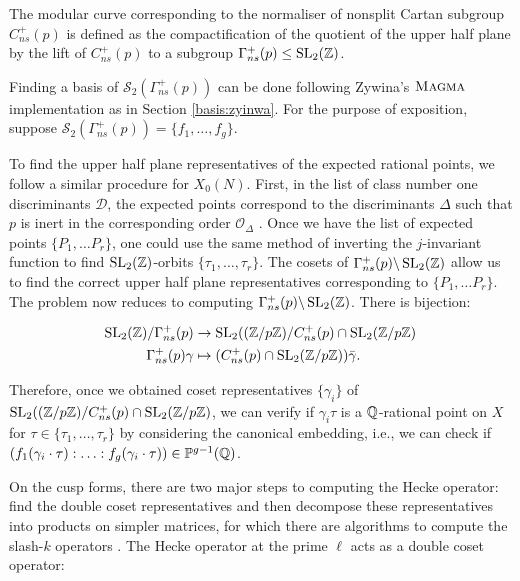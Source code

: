  The modular curve corresponding to the normaliser of nonsplit Cartan subgroup $C_{ns}^+(p)$ is defined as the compactification of the quotient of the upper half plane by the lift of $C_{ns}^+(p)$ to a subgroup $\Gamma_{ns}^+(p) \leq \operatorname{SL}_2(\mathbb{Z})$.
 
 Finding a basis of $\mathcal{S}_2(\Gamma_{ns}^+(p))$ can be done following Zywina's $\textsc{Magma}{}$ implementation as in Section \ref{basis:zyinwa}. For the purpose of exposition, suppose $\mathcal{S}_2(\Gamma_{ns}^+(p)) = \{ f_1, \ldots, f_g \}$.
 
 To find the upper half plane representatives of the expected rational points, we follow a similar procedure for $X_0(N)$. First, in the list of class number one discriminants $\mathcal{D}$, the expected points correspond to the discriminants $\Delta$ such that $p$ is inert in the corresponding order $\mathcal{O}_\Delta$ \cite{Mazur77}. Once we have the list of expected points $\{ P_1, \ldots P_r \}$, one could use the same method of inverting the $j$-invariant function to find $\operatorname{SL}_2(\mathbb{Z})$-orbits $\{ \tau_1, \ldots, \tau_r \}$. The cosets of $\Gamma_{ns}^+(p) \backslash \operatorname{SL}_2(\mathbb{Z})$ allow us to find the correct upper half plane representatives corresponding to $\{ P_1, \ldots P_r \}$. The problem now reduces to computing $\Gamma_{ns}^+(p) \backslash \operatorname{SL}_2(\mathbb{Z})$. There is bijection:
 
 \begin{align*}
    \operatorname{SL}_2(\mathbb{Z})/\Gamma_{ns}^+(p) &\rightarrow \operatorname{SL}_2((\mathbb{Z}/p\mathbb{Z})/C_{ns}^+(p) \cap \operatorname{SL}_2(\mathbb{Z}/p\mathbb{Z})\\
      \Gamma_{ns}^+(p) \gamma &\mapsto (C_{ns}^+(p) \cap \operatorname{SL}_2(\mathbb{Z}/p\mathbb{Z}))\bar{\gamma}.
\end{align*}

Therefore, once we obtained coset representatives $\{ \gamma_i \}$ of $\operatorname{SL}_2((\mathbb{Z}/p\mathbb{Z})/C_{ns}^+(p) \cap \operatorname{SL}_2(\mathbb{Z}/p\mathbb{Z})$, we can verify if $\gamma_i \tau$ is a $\mathbb{Q}$-rational point on $X$ for $\tau \in \{ \tau_1, \ldots, \tau_r\}$ by considering the canonical embedding, i.e., we can check if $(f_1(\gamma_i \cdot \tau) : \ldots : f_g(\gamma_i \cdot \tau)) \in \mathbb{P}^{g-1}(\mathbb{Q})$.

On the cusp forms, there are two major steps to computing the Hecke operator: find the double coset representatives and then decompose these representatives into products on simpler matrices, for which there are algorithms to compute the slash-$k$ operators \cite{Zywina2020ComputingAO,Shurman}. The Hecke operator at the prime $\ell$ acts as a double coset operator:

